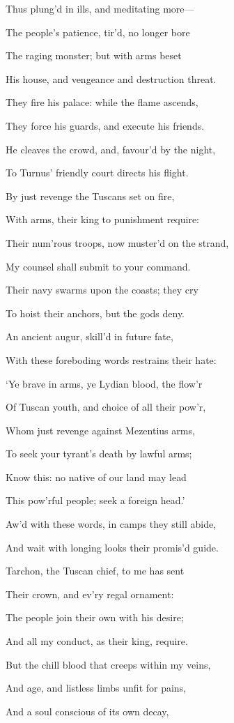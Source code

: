 Thus plung’d in ills, and meditating more—

The people’s patience, tir’d, no longer bore

The raging monster; but with arms beset

His house, and vengeance and destruction threat.

They fire his palace: while the flame ascends,

They force his guards, and execute his friends.

He cleaves the crowd, and, favour’d by the night,

To Turnus’ friendly court directs his flight.

By just revenge the Tuscans set on fire,

With arms, their king to punishment require:

Their num’rous troops, now muster’d on the strand,

My counsel shall submit to your command.

Their navy swarms upon the coasts; they cry

To hoist their anchors, but the gods deny.

An ancient augur, skill’d in future fate,

With these foreboding words restrains their hate:

‘Ye brave in arms, ye Lydian blood, the flow’r

Of Tuscan youth, and choice of all their pow’r,

Whom just revenge against Mezentius arms,

To seek your tyrant’s death by lawful arms;

Know this: no native of our land may lead

This pow’rful people; seek a foreign head.’

Aw’d with these words, in camps they still abide,

And wait with longing looks their promis’d guide.

Tarchon, the Tuscan chief, to me has sent

Their crown, and ev’ry regal ornament:

The people join their own with his desire;

And all my conduct, as their king, require.

But the chill blood that creeps within my veins,

And age, and listless limbs unfit for pains,

And a soul conscious of its own decay,

